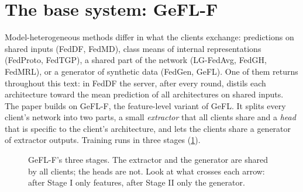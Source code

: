 \section{The base system: GeFL-F}\label{ch:gefl}

Model-heterogeneous methods differ in what the clients exchange: predictions on shared inputs (FedDF, FedMD), class
means of internal representations (FedProto, FedTGP), a shared part of the network (LG-FedAvg, FedGH, FedMRL), or a
generator of synthetic data (FedGen, GeFL). One of them returns throughout this text: in FedDF the server, after
every round, distils each architecture toward the mean prediction of all architectures on shared inputs. The paper
builds on GeFL-F, the feature-level variant of GeFL. It splits
every client's network into two parts, a small \emph{extractor} that all clients share and a \emph{head} that is
specific to the client's architecture, and lets the clients share a generator of extractor outputs. Training runs in
three stages (\cref{fig:s-pipeline}).

\begin{figure}[t]
\centering
{}
\caption{GeFL-F's three stages. The extractor and the generator are shared by all clients; the heads are not. Look
at what crosses each arrow: after Stage I only features, after Stage II only the generator.}
\label{fig:s-pipeline}
\end{figure}

